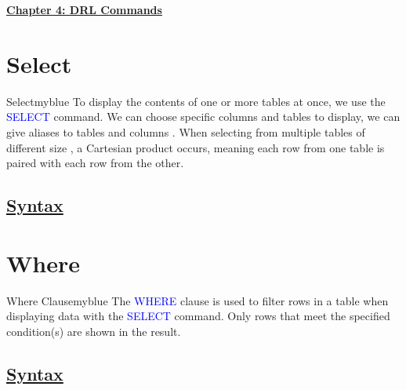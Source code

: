\newpage 
\null 
\vspace{0.15cm}

\begin{center} 
\Huge{\textbf{\underline{Chapter 4: DRL Commands}}}
\end{center}

\vspace{0.25cm}

\setcounter{section}{0}


\section{Select}


\begin{prettyBox}{Select}{myblue}
To display the contents of one or more tables at once, we use the \textcolor{blue}{SELECT} command. We can choose
specific columns and tables to display, we can give aliases to tables and columns . When selecting from multiple tables of different size
, a Cartesian product occurs, meaning each row from one table is paired with each row from the other.
\end{prettyBox}

\vspace{0.15cm}
\subsection*{\underline{Syntax}}



\vspace{0.35cm}
\section{Where}

\begin{prettyBox}{Where Clause}{myblue}
The \textcolor{blue}{WHERE} clause is used to filter rows in a table when displaying data with the
\textcolor{blue}{SELECT} command. Only rows that meet the specified condition(s) are shown in the result.
\end{prettyBox}

\vspace{0.15cm}
\subsection*{\underline{Syntax}}




